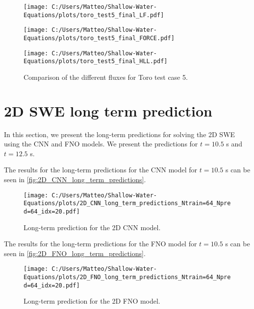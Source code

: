 \begin{figure}[H]
    \centering
    \begin{minipage}{0.45\textwidth}
        \centering
        \texttt{[image: C:/Users/Matteo/Shallow-Water-Equations/plots/toro\_test5\_final\_LF.pdf]}
    \end{minipage}%
    \hfill
    \begin{minipage}{0.45\textwidth}
        \centering
        \texttt{[image: C:/Users/Matteo/Shallow-Water-Equations/plots/toro\_test5\_final\_FORCE.pdf]}
    \end{minipage}
    
    \vspace{0.5cm} %
    \begin{minipage}{0.45\textwidth}
        \centering
        \texttt{[image: C:/Users/Matteo/Shallow-Water-Equations/plots/toro\_test5\_final\_HLL.pdf]}
    \end{minipage}
    \caption{Comparison of the different fluxes for Toro test case 5.}\label{fig:toro_test5_fluxes}
\end{figure}



\newpage
\section{2D SWE long term prediction}\label{app:2D_SWE_long_term_prediction}
In this section, we present the long-term predictions for solving the 2D SWE using the CNN and FNO models.
We present the predictions for $t = 10.5$ s and $t = 12.5$ s.

The results for the long-term predictions for the CNN model for $t = 10.5$ s can be seen in \autoref{fig:2D_CNN_long_term_predictions}.
\begin{figure}[H]
    \centering
    \texttt{[image: C:/Users/Matteo/Shallow-Water-Equations/plots/2D\_CNN\_long\_term\_predictions\_Ntrain=64\_Npred=64\_idx=20.pdf]}
    \caption{Long-term prediction for the 2D CNN model.}\label{fig:2D_CNN_long_term_predictions}
\end{figure}

The results for the long-term predictions for the FNO model for $t= 10.5$ s can be seen in \autoref{fig:2D_FNO_long_term_predictions}.
\begin{figure}[H]
    \centering
    \texttt{[image: C:/Users/Matteo/Shallow-Water-Equations/plots/2D\_FNO\_long\_term\_predictions\_Ntrain=64\_Npred=64\_idx=20.pdf]}
    \caption{Long-term prediction for the 2D FNO model.}\label{fig:2D_FNO_long_term_predictions}
\end{figure}

